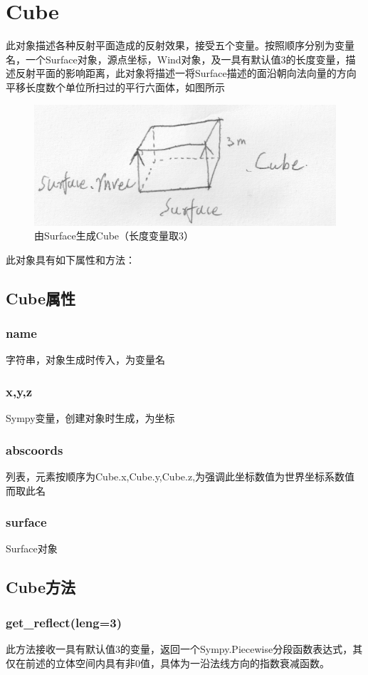 \documentclass[]{ctexart}
\begin{document}
\section{Cube}
此对象描述各种反射平面造成的反射效果，接受五个变量。按照顺序分别为变量名，一个Surface对象，源点坐标，Wind对象，及一具有默认值3的长度变量，描述反射平面的影响距离，此对象将描述一将Surface描述的面沿朝向法向量的方向平移长度数个单位所扫过的平行六面体，如图所示

\begin{figure}[h] 
  \centering
  \includegraphics[width=0.8
  \textwidth]{pic3.png} 
  \caption{由Surface生成Cube（长度变量取3）} 
  
\end{figure}

此对象具有如下属性和方法：
\subsection{Cube属性}
\subsubsection{name}
字符串，对象生成时传入，为变量名
\subsubsection{x,y,z}
Sympy变量，创建对象时生成，为坐标
\subsubsection{abscoords}
列表，元素按顺序为Cube.x,Cube.y,Cube.z,为强调此坐标数值为世界坐标系数值而取此名
\subsubsection{surface}
Surface对象
\subsection{Cube方法}
\subsubsection{get\_reflect(leng=3)}
此方法接收一具有默认值3的变量，返回一个Sympy.Piecewise分段函数表达式，其仅在前述的立体空间内具有非0值，具体为一沿法线方向的指数衰减函数。
\end{document}
